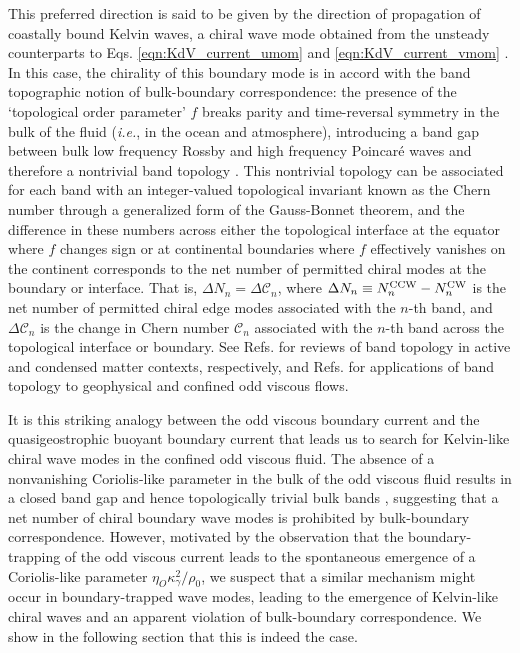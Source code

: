 \documentclass[%
 reprint,
superscriptaddress,
longbibliography,
 amsmath,amssymb,
 prl,
 citeautoscript,
]{revtex4-1}
\begin{document}
This preferred direction is said to be given by the direction of propagation of coastally bound Kelvin waves, a chiral wave mode obtained from the unsteady counterparts to Eqs. \ref{eqn:KdV_current_umom} and \ref{eqn:KdV_current_vmom} \cite{Gill, science_topology, continuum_topology}. In this case, the chirality of this boundary mode is in accord with the band topographic notion of bulk-boundary correspondence: the presence of the `topological order parameter' $f$ breaks parity and time-reversal symmetry in the bulk of the fluid ({\it i.e.}, in the ocean and atmosphere), introducing a band gap between bulk low frequency Rossby and high frequency Poincar\'{e} waves and therefore a nontrivial band topology \cite{science_topology}. This nontrivial topology can be associated for each band with an integer-valued topological invariant known as the Chern number through a generalized form of the Gauss-Bonnet theorem, and the difference in these numbers across either the topological interface at the equator where $f$ changes sign or at continental boundaries where $f$ effectively vanishes on the continent corresponds to the net number of permitted chiral modes at the boundary or interface. That is, $\Delta N_n = \Delta \mathcal{C}_n$, where $\Delta N_n \equiv N_n^{\rm CCW} - N_n^{\rm CW}$ is the net number of permitted chiral edge modes associated with the $n$-th band, and $\Delta \mathcal{C}_n$ is the change in Chern number $\mathcal{C}_n$ associated with the $n$-th band across the topological interface or boundary. See Refs. \cite{topology_soft_matter, fuchs} for reviews of band topology in active and condensed matter contexts, respectively, and Refs. \cite{boundary_waves, science_topology, continuum_topology} for applications of band topology to geophysical and confined odd viscous flows.

It is this striking analogy between the odd viscous boundary current and the quasigeostrophic buoyant boundary current that leads us to search for Kelvin-like chiral wave modes in the confined odd viscous fluid. The absence of a nonvanishing Coriolis-like parameter in the bulk of the odd viscous fluid results in a closed band gap and hence topologically trivial bulk bands \cite{boundary_waves}, suggesting that a net number of chiral boundary wave modes is prohibited by bulk-boundary correspondence. However, motivated by the observation that the boundary-trapping of the odd viscous current leads to the spontaneous emergence of a Coriolis-like parameter $\eta_O \kappa_{\gamma}^2 / \rho_0$, we suspect that a similar mechanism might occur in boundary-trapped wave modes, leading to the emergence of Kelvin-like chiral waves and an apparent violation of bulk-boundary correspondence. We show in the following section that this is indeed the case.
\end{document}
